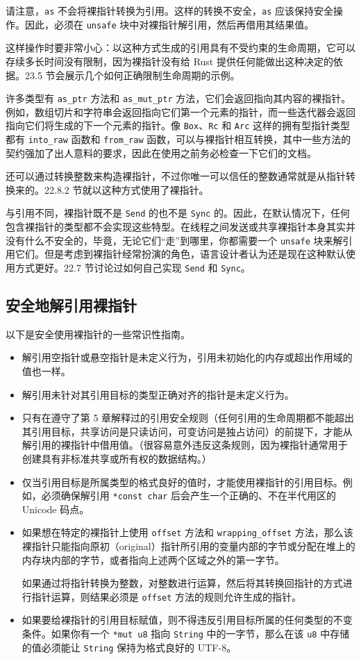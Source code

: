 请注意，\texttt{as} 不会将裸指针转换为引用。这样的转换不安全，\texttt{as} 应该保持安全操作。因此，必须在 \texttt{unsafe} 块中对裸指针解引用，然后再借用其结果值。

这样操作时要非常小心：以这种方式生成的引用具有不受约束的生命周期，它可以存续多长时间没有限制，因为裸指针没有给 Rust 提供任何能做出这种决定的依据。23.5 节会展示几个如何正确限制生命周期的示例。

许多类型有 \texttt{as\_ptr} 方法和 \texttt{as\_mut\_ptr} 方法，它们会返回指向其内容的裸指针。例如，数组切片和字符串会返回指向它们第一个元素的指针，而一些迭代器会返回指向它们将生成的下一个元素的指针。像 \texttt{Box}、\texttt{Rc} 和 \texttt{Arc} 这样的拥有型指针类型都有 \texttt{into\_raw} 函数和 \texttt{from\_raw} 函数，可以与裸指针相互转换，其中一些方法的契约强加了出人意料的要求，因此在使用之前务必检查一下它们的文档。

还可以通过转换整数来构造裸指针，不过你唯一可以信任的整数通常就是从指针转换来的。22.8.2 节就以这种方式使用了裸指针。

与引用不同，裸指针既不是 \texttt{Send} 的也不是 \texttt{Sync} 的。因此，在默认情况下，任何包含裸指针的类型都不会实现这些特型。在线程之间发送或共享裸指针本身其实并没有什么不安全的，毕竟，无论它们“走”到哪里，你都需要一个 \texttt{unsafe} 块来解引用它们。但是考虑到裸指针经常扮演的角色，语言设计者认为还是现在这种默认使用方式更好。22.7 节讨论过如何自己实现 \texttt{Send} 和 \texttt{Sync}。

\subsection{安全地解引用裸指针}

以下是安全使用裸指针的一些常识性指南。

\begin{itemize}
\item 解引用空指针或悬空指针是未定义行为，引用未初始化的内存或超出作用域的值也一样。
\item 解引用未针对其引用目标的类型正确对齐的指针是未定义行为。
\item 只有在遵守了第 5 章解释过的引用安全规则（任何引用的生命周期都不能超出其引用目标，共享访问是只读访问，可变访问是独占访问）的前提下，才能从解引用的裸指针中借用值。（很容易意外违反这条规则，因为裸指针通常用于创建具有非标准共享或所有权的数据结构。）
\item 仅当引用目标是所属类型的格式良好的值时，才能使用裸指针的引用目标。例如，必须确保解引用 \texttt{*const char} 后会产生一个正确的、不在半代用区的 Unicode 码点。
\item 如果想在特定的裸指针上使用 \texttt{offset} 方法和 \texttt{wrapping\_offset} 方法，那么该裸指针只能指向原初（original）指针所引用的变量内部的字节或分配在堆上的内存块内部的字节，或者指向上述两个区域之外的第一字节。

如果通过将指针转换为整数，对整数进行运算，然后将其转换回指针的方式进行指针运算，则结果必须是 \texttt{offset} 方法的规则允许生成的指针。
\item 如果要给裸指针的引用目标赋值，则不得违反引用目标所属的任何类型的不变条件。如果你有一个 \texttt{*mut u8} 指向 \texttt{String} 中的一字节，那么在该 \texttt{u8} 中存储的值必须能让 \texttt{String} 保持为格式良好的 UTF-8。
\end{itemize}

